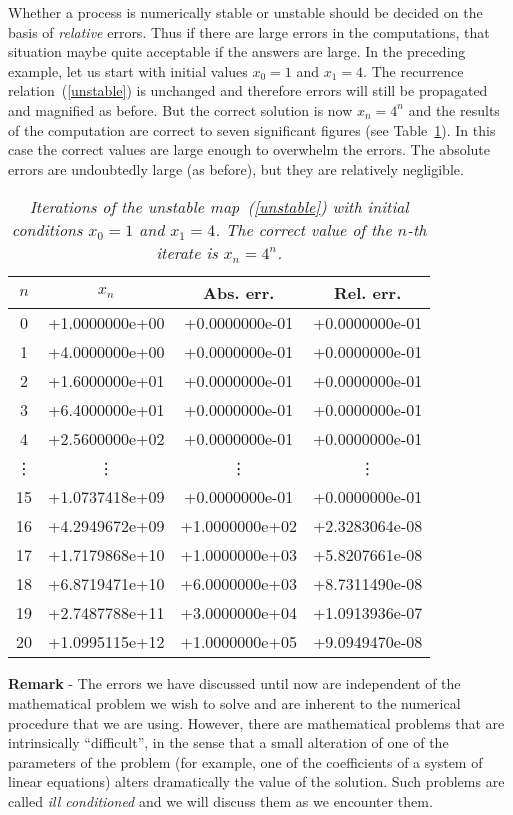 Whether a process is numerically stable or unstable should be decided
on the basis of \textit{relative} errors.  Thus if there are large
errors in the computations, that situation maybe quite acceptable if
the answers are large.  In the preceding example, let us start with
initial values $x_0=1$ and $x_1=4$.  The recurrence
relation~(\ref{unstable}) is unchanged and therefore errors will still
be propagated and magnified as before.  But the correct solution is
now $x_n=4^n$ and the results of the computation are correct to seven
significant figures (see Table~\ref{unst2}).  In this case the correct
values are large enough to overwhelm the errors.  The absolute errors
are undoubtedly large (as before), but they are relatively negligible.

\begin{table}
  \begin{center}
    \begin{tabular}{|c|c|c|c|} \hline
      $n$ & $x_n$ & Abs. err. & Rel. err. \\ \hline \hline
      0 & +1.0000000e+00 & +0.0000000e-01 & +0.0000000e-01 \\ \hline 
      1 & +4.0000000e+00 & +0.0000000e-01 & +0.0000000e-01 \\ \hline 
      2 & +1.6000000e+01 & +0.0000000e-01 & +0.0000000e-01 \\ \hline 
      3 & +6.4000000e+01 & +0.0000000e-01 & +0.0000000e-01 \\ \hline 
      4 & +2.5600000e+02 & +0.0000000e-01 & +0.0000000e-01 \\ \hline 
      \vdots & \vdots & \vdots & \vdots \\ \hline
      15 & +1.0737418e+09 & +0.0000000e-01 & +0.0000000e-01 \\ \hline 
      16 & +4.2949672e+09 & +1.0000000e+02 & +2.3283064e-08 \\ \hline 
      17 & +1.7179868e+10 & +1.0000000e+03 & +5.8207661e-08 \\ \hline 
      18 & +6.8719471e+10 & +6.0000000e+03 & +8.7311490e-08 \\ \hline 
      19 & +2.7487788e+11 & +3.0000000e+04 & +1.0913936e-07 \\ \hline 
      20 & +1.0995115e+12 & +1.0000000e+05 & +9.0949470e-08 \\ \hline 
    \end{tabular}
  \end{center}
  \caption{\label{unst2} \it Iterations of the unstable
    map~(\ref{unstable}) with initial conditions $x_0=1$ and
    $x_1=4$.   The correct value of the $n$-th iterate is $x_n=4^n$.}
\end{table}

\smallskip

\noindent
\textbf{Remark} - The errors we have discussed until now are
independent of the mathematical problem we wish to solve and are
inherent to the numerical procedure that we are using.   However,
there are mathematical problems that are intrinsically ``difficult'',
in the sense that a small alteration of one of the parameters of the
problem (for example, one of the coefficients of a system of linear
equations) alters dramatically the value of the solution.   Such
problems are called \textit{ill conditioned} and we will discuss them
as we encounter them.
